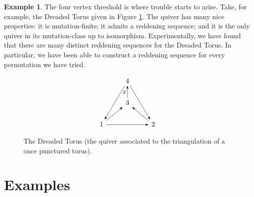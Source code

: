 \documentclass[11pt, letterpaper]{amsart}
\newcommand{\cS}[1]{{\noindent\textsf{\color{purple}$\blacksquare$~#1~$\blacksquare$}}}
\newcommand{\hide}[1]{}
\theoremstyle{definition}
\newtheorem{remark}[theorem]{Remark}
\newtheorem{example}[theorem]{Example}
\numberwithin{equation}{section}
\begin{document}
\begin{example} \label{eg:dreaded-torus-sec-3}
    The four vertex threshold is where trouble starts to arise.
    Take, for example, the Dreaded Torus given in Figure \ref{fig:dreaded-torus-sec-3}.
    The quiver has many nice properties: it is mutation-finite; it admits a reddening sequence; and it is the only quiver in its mutation-class up to isomorphism.
    Experimentally, we have found that there are many distinct reddening sequences for the Dreaded Torus.
    In particular, we have been able to construct a reddening sequence for every permutation we have tried.
    
    \begin{figure}[ht]
        \centering
        \[\begin{tikzcd}[every arrow/.append style = {-{Stealth}}]
        & 4 \\
        & 3 \\
        1 & & 2
        \arrow[from=2-2, to=1-2, "2"]
        \arrow[from=3-1, to=2-2]
        \arrow[from=3-3, to=2-2]
        \arrow[from=1-2, to=3-1]
        \arrow[from=3-1, to=3-3]
        \arrow[from=1-2, to=3-3]
        \end{tikzcd}\]
        \caption{The Dreaded Torus (the quiver associated to the triangulation of a once punctured torus).}
        \label{fig:dreaded-torus-sec-3}
    \end{figure}
    
\end{example}

\hide{
\begin{remark}
More generally, one could ask which sets of permutations are associated to the reddening sequences of a given quiver. 
Our conjecture is equivalent to saying that if $\big [ A_2 \big ]$ does not embed then this set is trivial.
As shown in Example~\ref{fig:dreaded torus}, this set can be quite large. \cS{Should check: does the Dreaded Torus have the entirety of $S_4$?}
Surprisingly, in every example this set of permutations seems to form a group (if non-empty). 
\end{remark}
\cS{Is the identity always in this set? Is it a group?}
} %

\newpage

\section{Examples} %
\label{sec:examples}
\end{document}
